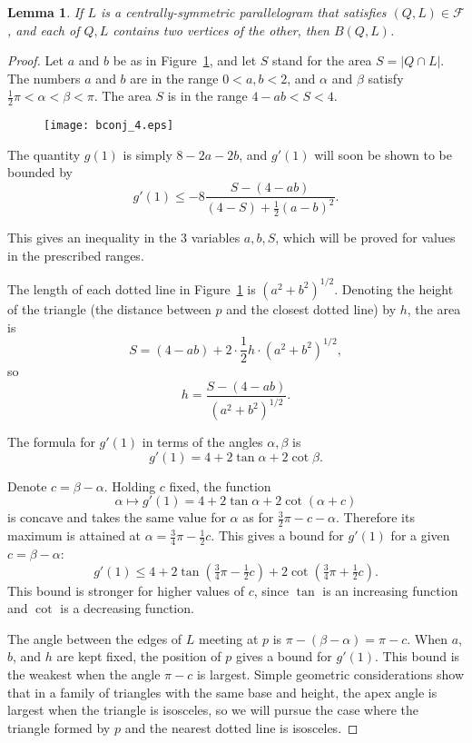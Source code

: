 \documentclass[a4paper,10pt,twoside,reqno,intlimits]{amsart}
\newtheorem*{lemma}{Lemma}
\begin{document}
\begin{lemma}
If $L$ is a centrally-symmetric parallelogram that satisfies $(Q, L) \in {\mathcal{F}}$,
and each of $Q, L$ contains two vertices of the other, then $B(Q, L)$.
\end{lemma}
\begin{proof}
Let $a$ and $b$ be as in Figure~\ref{fig:lemma2}, and let $S$ stand for the area $S = |Q \cap L|$.
The numbers $a$ and $b$ are in the range $0 < a, b < 2$, and $\alpha$ and $\beta$ satisfy
$\frac{1}{2} \pi < \alpha < \beta < \pi$.
The area $S$ is in the range $4 - ab < S < 4$.

\begin{figure}[h!]
\texttt{[image: bconj\_4.eps]}
\caption{}
\label{fig:lemma2}
\end{figure}

The quantity $g(1)$ is simply $8 - 2a - 2b$, and $g'(1)$ will soon be shown to be bounded by
$$ g'(1) \le -8 \frac{ S - (4 - ab) } { (4 - S) + \frac{1}{2} (a-b)^2 } . $$

This gives an inequality in the 3 variables $a, b, S$, which will be proved for values in the prescribed ranges.

The length of each dotted line in Figure~\ref{fig:lemma2} is $(a^2 + b^2)^{1/2}$.
Denoting the height of the triangle (the distance between $p$ and the closest dotted line) by $h$,
the area is
$$ S = (4 - ab) + 2 \cdot \frac{1}{2} h \cdot (a^2 + b^2)^{1/2} , $$
so
$$h = \frac{S - (4 - ab)}{(a^2 + b^2)^{1/2}} . $$

The formula for $g'(1)$ in terms of the angles $\alpha, \beta$ is
$$ g'(1) = 4 + 2 \tan \alpha + 2 \cot \beta . $$

Denote $c = \beta - \alpha$.
Holding $c$ fixed, the function
$$ \alpha \mapsto g'(1) = 4 + 2 \tan \alpha + 2 \cot (\alpha + c) $$
is concave and takes the same value for $\alpha$ as for $\frac{3}{2}\pi - c - \alpha$.
Therefore its maximum is attained at $\alpha = \frac{3}{4}\pi - \frac{1}{2}c$.
This gives a bound for $g'(1)$ for a given $c = \beta - \alpha$:
$$ g'(1) \le 4 + 2 \tan \left( \tfrac{3}{4}\pi - \tfrac{1}{2}c \right) + 2 \cot \left( \tfrac{3}{4}\pi + \tfrac{1}{2}c \right) . $$
This bound is stronger for higher values of $c$, since $\tan$ is an increasing function and $\cot$ is
a decreasing function.

The angle between the edges of $L$ meeting at $p$ is $\pi - (\beta - \alpha) = \pi - c$.
When $a$, $b$, and $h$ are kept fixed, the position of $p$ gives a bound for $g'(1)$.
This bound is the weakest when the angle $\pi - c$ is largest.
Simple geometric considerations show that in a family of triangles with the same base and height,
the apex angle is largest when the triangle is isosceles, so we will pursue the case where the triangle
formed by $p$ and the nearest dotted line is isosceles.


\end{proof}
\end{document}
